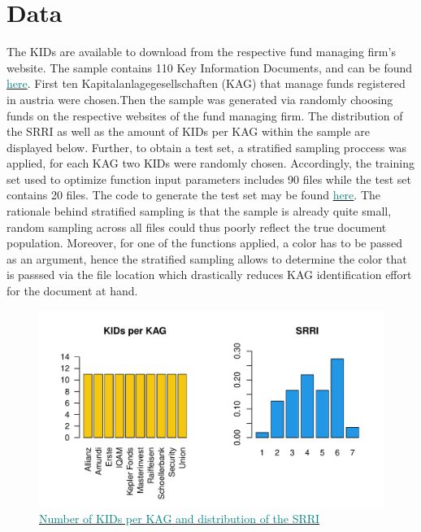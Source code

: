 \documentclass[aodsor,preprint]{imsart}
\numberwithin{equation}{section}
\theoremstyle{plain}
\begin{document}
\section{Data}
The KIDs are available to download from the respective fund managing firm's website. The  sample contains 110 Key Information Documents, and can be found \href{https://github.com/Base-R-Best-R/KID/tree/main/KIDs}{\textcolor{teal}{here}}. First ten Kapitalanlagegesellschaften (KAG) that manage funds registered in austria were chosen.Then the sample was generated via randomly choosing funds on the respective websites of the fund managing firm. The distribution of the SRRI as well as the amount of KIDs per KAG within the sample are displayed below. Further, to obtain a test set, a stratified sampling proccess was applied, for each KAG two KIDs were randomly chosen. Accordingly, the training set used to optimize function input parameters includes 90 files while the test set contains 20 files. The code to generate the test set may be found \href{https://github.com/Base-R-Best-R/KID/blob/main/Code/Package/DEV/Generate_Test_Sample.R}{\textcolor{teal}{here}}. The rationale behind stratified sampling is that the sample is already quite small, random sampling across all files could thus poorly reflect the true document population. Moreover, for one of the functions applied, a color has to be passed as an argument, hence the stratified sampling allows to determine the color that is passsed via the file location which drastically reduces KAG identification effort for the document at hand. 

\begin{figure}[H]
	\includegraphics[width = 12cm]{data_overview.pdf}
	\caption{\href{https://github.com/Base-R-Best-R/KID/blob/main/Code/Tests/Test_ext_Function.pdf}{\textcolor{teal}{Number of KIDs per KAG and distribution of the SRRI}}}
\end{figure}
\end{document}
